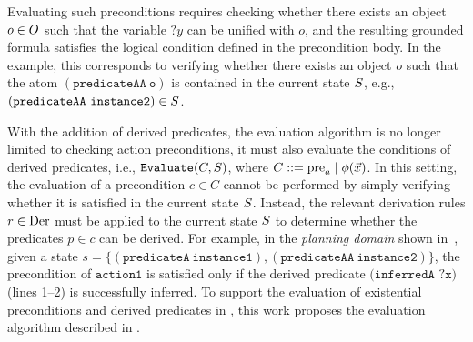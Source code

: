 Evaluating such preconditions requires checking whether there exists an object $o \in O$ such that the variable $?y$ can be unified with $o$, and the resulting grounded formula satisfies the logical condition defined in the precondition body. In the example, this corresponds to verifying whether there exists an object $o$ such that the atom $(\texttt{predicateAA}~\texttt{o})$ is contained in the current state $S$, e.g., $(\texttt{predicateAA}~\texttt{instance2}) \in S$.

With the addition of derived predicates, the evaluation algorithm is no longer limited to checking action preconditions, it must also evaluate the conditions of derived predicates, i.e., $\texttt{Evaluate}(C, S)$, where $C ::= \operatorname{pre}_a \mid \phi(\vec{x})$. In this setting, the evaluation of a precondition $c \in C$ cannot be performed by simply verifying whether it is satisfied in the current state $S$. Instead, the relevant derivation rules $r \in \text{Der}$ must be applied to the current state $S$ to determine whether the predicates $p \in c$ can be derived. For example, in the \emph{planning domain} shown in~, given a state $s = \{(\texttt{predicateA}~\texttt{instance1}), (\texttt{predicateAA}~\texttt{instance2})\}$, the precondition of $\texttt{action1}$ is satisfied only if the derived predicate $\texttt{(inferredA ?x)}$ (lines 1–2) is successfully inferred. To support the evaluation of existential preconditions and derived predicates in \plansys, this work proposes the evaluation algorithm described in .

